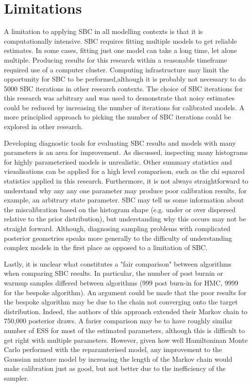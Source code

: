 \documentclass[12pt, a4paper]{article}
\begin{document}

\section{Limitations}
A limitation to applying SBC in all modelling contexts is that it is computationally intensive. SBC requires fitting multiple models to get reliable estimates. In some cases, fitting just one model can take a long time, let alone multiple. Producing results for this research within a reasonable timeframe required use of a computer cluster. Computing infrastructure may limit the opportunity for SBC to be performed,although it is probably not necessary to do 5000 SBC iterations in other research contexts. The choice of SBC iterations for this research was arbitrary and was used to demonstrate that noisy estimates could be reduced by increasing the number of iterations for calibrated models. A more principlied approach to picking the number of SBC iterations could be explored in other research.

Developing diagnostic tools for evaluating SBC results and models with many parameters is an area for improvement. As discussed, inspecting many histograms for highly parameterised models is unrealistic. Other summary statistics and visualisations can be applied for a high level comparison, such as the chi squared statistics applied in this research. Furthermore, it is not always straightforward to understand why any any one parameter may produce poor calibration results, for example, an arbitrary state parameter. SBC may tell us some information about the miscalibration based on the histogram shape (e.g. under or over dispersed relative to the prior distribution), but understanding why this occurs may not be straight forward. Although, diagnosing sampling problems with complicated posterior geometries speaks more generally to the difficulty of understanding complex models in the first place as opposed to a limitation of SBC.

Lastly, it is unclear what constitutes a "fair comparison" between algorithms when comparing SBC results. In particular, the number of post burnin or warmup samples differed between algorithms (999 post burn-in for HMC, 9999 for the bespoke algorithm). An argument could be made that the poor results for the bespoke algorithm may be due to the chain not converging onto the target distribution. Indeed, the authors of this approach extended their Markov chain to 750,000 posterior draws. A farier comparison may be to have roughly similar number of ESS for most of the estimated parameters, although this is difficult to get right with multiple parameters. However, given how well Hamiltoninan Monte Carlo performed with the reparamterised model, any improvement to the Gaussian mixture model by increasing the length of the Markov chain would make calibration just as good, but not better due to the inefficiency of the sampler. 
\end{document}
